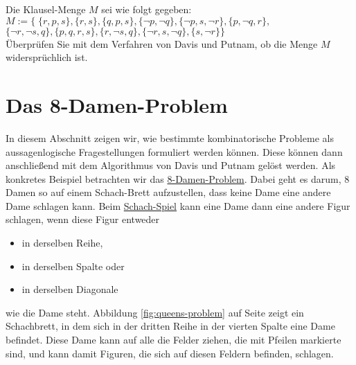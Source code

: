 \exercise
Die Klausel-Menge $M$ sei wie folgt gegeben: \\[0.2cm]
\hspace*{1.3cm} $M := \bigl\{ \; \{ r, p, s \},
                         \{r, s \}, \{ q, p, s \},
                         \{ \neg p,  \neg q\},
                         \{ \neg p, s,  \neg r\},
                         \{p,  \neg q, r \},$ \\[0.2cm]
\hspace*{2.6cm} $\{ \neg r,  \neg s, q\},
                         \{p, q, r, s \},
                         \{r,  \neg s, q\},
                         \{ \neg r,  s, \neg q\},
                         \{s, \neg r\} \bigr\}$ \\[0.2cm]
Überprüfen Sie mit dem Verfahren von Davis und Putnam, ob die Menge $M$ widersprüchlich ist.  
\eox


\section{Das 8-Damen-Problem}
In diesem Abschnitt zeigen wir, wie bestimmte kombinatorische Probleme als aussagenlogische Fragestellungen
formuliert werden können.  Diese können dann anschließend mit dem Algorithmus von Davis und Putnam gelöst werden.  Als
konkretes Beispiel betrachten wir das \href{https://en.wikipedia.org/wiki/Eight_queens_puzzle}{8-Damen-Problem}.  
Dabei geht es darum, 8 Damen so auf einem Schach-Brett aufzustellen, dass keine Dame eine andere Dame schlagen kann.
Beim \href{https://en.wikipedia.org/wiki/Chess}{Schach-Spiel} kann eine Dame dann eine andere Figur schlagen,
wenn diese Figur entweder 
\begin{itemize}
\item in derselben Reihe,
\item in derselben Spalte  oder
\item in derselben Diagonale
\end{itemize}
wie die Dame steht.  Abbildung \ref{fig:queens-problem} auf Seite \pageref{fig:queens-problem}
zeigt ein Schachbrett, in dem sich in der dritten Reihe in der vierten Spalte
eine Dame befindet.  Diese Dame kann auf alle die Felder ziehen, die mit Pfeilen markierte
sind, und kann damit Figuren, die sich auf diesen Feldern befinden, schlagen.

